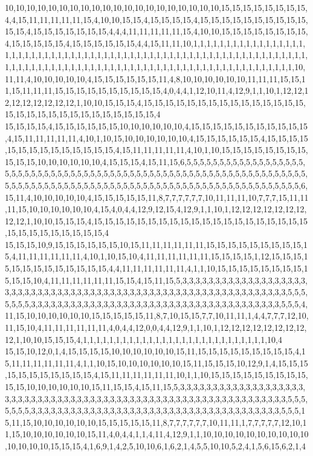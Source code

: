 10,10,10,10,10,10,10,10,10,10,10,10,10,10,10,10,10,10,10,10,15,15,15,15,15,15,15,15,4,4,15,11,11,11,11,11,15,4,10,10,15,15,4,15,15,15,15,4,15,15,15,15,15,15,15,15,15,15,15,15,4,15,15,15,15,15,15,15,4,4,4,11,11,11,11,11,15,4,10,10,15,15,15,15,15,15,15,15,4,15,15,15,15,15,4,15,15,15,15,15,15,4,4,15,11,11,10,1,1,1,1,1,1,1,1,1,1,1,1,1,1,1,1,1,1,1,1,1,1,1,1,1,1,1,1,1,1,1,1,1,1,1,1,1,1,1,1,1,1,1,1,1,1,1,1,1,1,1,1,1,1,1,1,1,1,1,1,1,1,1,1,1,1,1,1,1,1,1,1,1,1,1,1,1,1,1,1,1,1,1,1,1,1,1,1,1,1,1,1,1,1,1,1,1,1,1,1,1,1,1,1,1,1,1,10,11,11,4,10,10,10,10,10,4,15,15,15,15,15,15,11,4,8,10,10,10,10,10,10,11,11,11,15,15,11,15,11,11,11,15,15,15,15,15,15,15,15,15,15,4,0,4,4,1,12,10,11,4,12,9,1,1,10,1,12,12,12,12,12,12,12,12,12,1,10,10,15,15,15,4,15,15,15,15,15,15,15,15,15,15,15,15,15,15,15,15,15,15,15,15,15,15,15,15,15,15,15,15,15,4
15,15,15,15,4,15,15,15,15,15,15,10,10,10,10,10,10,4,15,15,15,15,15,15,15,15,15,15,15,4,15,11,11,11,11,11,4,10,1,10,15,10,10,10,10,10,10,4,15,15,15,15,15,15,4,15,15,15,15,15,15,15,15,15,15,15,15,15,15,4,15,11,11,11,11,11,4,10,1,10,15,15,15,15,15,15,15,15,15,15,15,10,10,10,10,10,10,4,15,15,15,4,15,11,15,6,5,5,5,5,5,5,5,5,5,5,5,5,5,5,5,5,5,5,5,5,5,5,5,5,5,5,5,5,5,5,5,5,5,5,5,5,5,5,5,5,5,5,5,5,5,5,5,5,5,5,5,5,5,5,5,5,5,5,5,5,5,5,5,5,5,5,5,5,5,5,5,5,5,5,5,5,5,5,5,5,5,5,5,5,5,5,5,5,5,5,5,5,5,5,5,5,5,5,5,5,5,5,5,5,5,5,5,5,5,6,15,11,4,10,10,10,10,10,4,15,15,15,15,15,11,8,7,7,7,7,7,7,10,11,11,11,10,7,7,7,15,11,11,11,15,10,10,10,10,10,10,4,15,4,0,4,4,12,9,12,15,4,12,9,1,1,10,1,12,12,12,12,12,12,12,12,12,1,10,10,15,15,15,4,15,15,15,15,15,15,15,15,15,15,15,15,15,15,15,15,15,15,15,15,15,15,15,15,15,15,15,15,15,4
15,15,15,10,9,15,15,15,15,15,15,10,15,11,11,11,11,11,11,15,15,15,15,15,15,15,15,15,15,4,11,11,11,11,11,11,4,10,1,10,15,10,4,11,11,11,11,11,11,15,15,15,15,1,12,15,15,15,15,15,15,15,15,15,15,15,15,15,4,4,11,11,11,11,11,11,4,1,1,10,15,15,15,15,15,15,15,15,15,15,15,10,4,11,11,11,11,11,11,15,15,4,15,11,15,5,3,3,3,3,3,3,3,3,3,3,3,3,3,3,3,3,3,3,3,3,3,3,3,3,3,3,3,3,3,3,3,3,3,3,3,3,3,3,3,3,3,3,3,3,3,3,3,3,3,3,3,3,3,3,3,3,3,3,3,3,3,3,5,5,5,5,5,5,5,3,3,3,3,3,3,3,3,3,3,3,3,3,3,3,3,3,3,3,3,3,3,3,3,3,3,3,3,3,3,3,3,3,3,3,3,3,3,5,5,5,4,11,15,10,10,10,10,10,10,15,15,15,15,15,11,8,7,10,15,15,7,7,10,11,11,1,4,4,7,7,7,12,10,11,15,10,4,11,11,11,11,11,11,4,0,4,4,12,0,0,4,4,12,9,1,1,10,1,12,12,12,12,12,12,12,12,12,1,10,10,15,15,15,4,1,1,1,1,1,1,1,1,1,1,1,1,1,1,1,1,1,1,1,1,1,1,1,1,1,1,1,1,10,4
15,15,10,12,0,1,4,15,15,15,15,10,10,10,10,10,10,15,11,15,15,15,15,15,15,15,15,15,4,15,11,11,11,11,11,11,4,1,1,10,15,10,10,10,10,10,10,15,11,15,15,15,10,12,9,1,4,15,15,15,15,15,15,15,15,15,15,15,4,15,11,11,11,11,11,11,10,1,1,10,15,15,15,15,15,15,15,15,15,15,15,10,10,10,10,10,10,15,11,15,15,4,15,11,15,5,3,3,3,3,3,3,3,3,3,3,3,3,3,3,3,3,3,3,3,3,3,3,3,3,3,3,3,3,3,3,3,3,3,3,3,3,3,3,3,3,3,3,3,3,3,3,3,3,3,3,3,3,3,3,3,3,3,3,3,3,3,3,5,5,5,5,5,5,5,3,3,3,3,3,3,3,3,3,3,3,3,3,3,3,3,3,3,3,3,3,3,3,3,3,3,3,3,3,3,3,3,3,3,3,3,3,3,5,5,5,15,11,15,10,10,10,10,10,10,15,15,15,15,15,11,8,7,7,7,7,7,7,10,11,11,1,7,7,7,7,7,12,10,11,15,10,10,10,10,10,10,15,11,4,0,4,4,1,1,4,11,4,12,9,1,1,10,10,10,10,10,10,10,10,10,10,10,10,10,10,15,15,15,4,1,6,9,1,4,2,5,10,10,6,1,6,2,1,4,5,5,10,10,5,2,4,1,5,6,15,6,2,1,4
